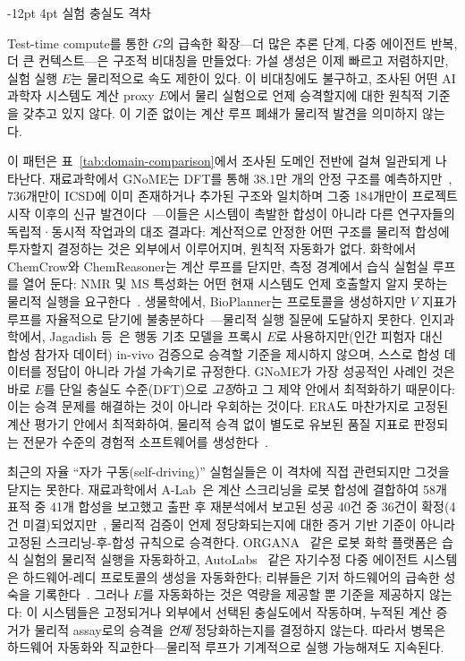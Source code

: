 \documentclass[11pt]{article}
\makeatletter
\renewcommand\subsection{\@startsection{subsection}{2}{\z@}%
  {-12pt \@plus -2pt \@minus -2pt}%
  {4pt \@plus 1pt}%
  {\normalfont\normalsize\bfseries}}
\makeatother
\begin{document}
\subsection{실험 충실도 격차}
\label{sec:op3}

Test-time compute를 통한 $G$의 급속한 확장---더 많은 추론 단계, 다중 에이전트 반복, 더 큰 컨텍스트---은 구조적 비대칭을 만들었다: 가설 생성은 이제 빠르고 저렴하지만, 실험 실행 $E$는 물리적으로 속도 제한이 있다. 이 비대칭에도 불구하고, 조사된 어떤 AI 과학자 시스템도 계산 proxy $E$에서 물리 실험으로 언제 승격할지에 대한 원칙적 기준을 갖추고 있지 않다. 이 기준 없이는 계산 루프 폐쇄가 물리적 발견을 의미하지 않는다.

이 패턴은 표~\ref{tab:domain-comparison}에서 조사된 도메인 전반에 걸쳐 일관되게 나타난다. 재료과학에서 GNoME는 DFT를 통해 38.1만 개의 안정 구조를 예측하지만~\citep{merchant2023gnome}, 736개만이 ICSD에 이미 존재하거나 추가된 구조와 일치하며 그중 184개만이 프로젝트 시작 이후의 신규 발견이다~\citep{merchant2023gnome}---이들은 시스템이 촉발한 합성이 아니라 다른 연구자들의 독립적·동시적 작업과의 대조 결과다: 계산적으로 안정한 어떤 구조를 물리적 합성에 투자할지 결정하는 것은 외부에서 이루어지며, 원칙적 자동화가 없다. 화학에서 ChemCrow와 ChemReasoner는 계산 루프를 닫지만, 측정 경계에서 습식 실험실 루프를 열어 둔다: NMR 및 MS 특성화는 어떤 현재 시스템도 언제 호출할지 알지 못하는 물리적 실행을 요구한다~\citep{gromski2019chemical}. 생물학에서, BioPlanner는 프로토콜을 생성하지만 $V$ 지표가 루프를 자율적으로 닫기에 불충분하다~\citep{odonoghue2023bioplanner}---물리적 실행 질문에 도달하지 못한다. 인지과학에서, Jagadish 등~\citep{jagadish2026automatize}은 행동 기초 모델을 프록시 $E$로 사용하지만(인간 피험자 대신 합성 참가자 데이터) in-vivo 검증으로 승격할 기준을 제시하지 않으며, 스스로 합성 데이터를 정답이 아니라 가설 가속기로 규정한다. GNoME가 가장 성공적인 사례인 것은 바로 $E$를 단일 충실도 수준(DFT)으로 \emph{고정}하고 그 제약 안에서 최적화하기 때문이다: 이는 승격 문제를 해결하는 것이 아니라 우회하는 것이다. ERA도 마찬가지로 고정된 계산 평가기 안에서 최적화하여, 물리적 승격 없이 별도로 유보된 품질 지표로 판정되는 전문가 수준의 경험적 소프트웨어를 생성한다~\citep{aygun2026era}.

최근의 자율 ``자가 구동(self-driving)'' 실험실들은 이 격차에 직접 관련되지만 그것을 닫지는 못한다. 재료과학에서 A-Lab~\citep{szymanski2023alab}은 계산 스크리닝을 로봇 합성에 결합하여 58개 표적 중 41개 합성을 보고했고 출판 후 재분석에서 보고된 성공 40건 중 36건이 확정(4건 미결)되었지만~\citep{szymanski2026correction}, 물리적 검증이 언제 정당화되는지에 대한 증거 기반 기준이 아니라 고정된 스크리닝-후-합성 규칙으로 승격한다. ORGANA~\citep{darvish2024organa} 같은 로봇 화학 플랫폼은 습식 실험의 물리적 실행을 자동화하고, AutoLabs~\citep{panapitiya2025autolabs} 같은 자기수정 다중 에이전트 시스템은 하드웨어-레디 프로토콜의 생성을 자동화한다; 리뷰들은 기저 하드웨어의 급속한 성숙을 기록한다~\citep{tobias2025selfdriving}. 그러나 $E$를 자동화하는 것은 역량을 제공할 뿐 기준을 제공하지 않는다: 이 시스템들은 고정되거나 외부에서 선택된 충실도에서 작동하며, 누적된 계산 증거가 물리적 assay로의 승격을 \emph{언제} 정당화하는지를 결정하지 않는다. 따라서 병목은 하드웨어 자동화와 직교한다---물리적 루프가 기계적으로 실행 가능해져도 지속된다.
\end{document}
